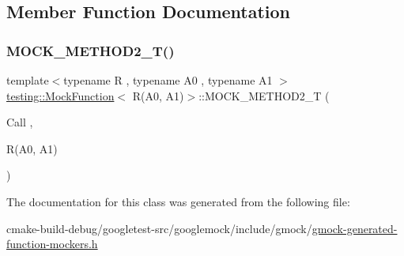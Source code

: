 \subsection{Member Function Documentation}
\mbox{\label{classtesting_1_1MockFunction_3_01R_07A0_00_01A1_08_4_a5a4d673a3252cab866f0a4fa97486190}} 
\subsubsection{\texorpdfstring{MOCK\_METHOD2\_T()}{MOCK\_METHOD2\_T()}}
{\footnotesize\ttfamily template$<$typename R , typename A0 , typename A1 $>$ \\
\mbox{\hyperlink{classtesting_1_1MockFunction}{testing\+::\+Mock\+Function}}$<$ R(A0, A1)$>$\+::M\+O\+C\+K\+\_\+\+M\+E\+T\+H\+O\+D2\+\_\+T (\begin{DoxyParamCaption}\item[{Call}]{,  }\item[{R(A0, A1)}]{ }\end{DoxyParamCaption})}



The documentation for this class was generated from the following file\+:\begin{DoxyCompactItemize}
\item 
cmake-\/build-\/debug/googletest-\/src/googlemock/include/gmock/\mbox{\hyperlink{gmock-generated-function-mockers_8h}{gmock-\/generated-\/function-\/mockers.\+h}}\end{DoxyCompactItemize}
